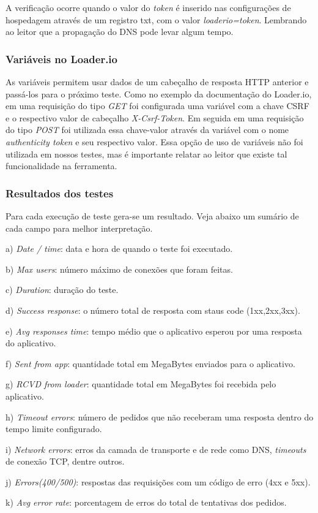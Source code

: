   A verificação ocorre quando o valor do \textit{token} é inserido nas configurações de hospedagem através de um
  registro txt, com o valor \textit{loaderio=token}.
  Lembrando ao leitor que a propagação do \ac{DNS} pode levar algum tempo.

\subsubsection{Variáveis no Loader.io}

  As variáveis permitem usar dados de um cabeçalho de resposta \ac{HTTP} anterior e passá-los para o próximo
  teste.
  Como no exemplo da documentação do Loader.io, em uma requisição do tipo \textit{GET} foi configurada uma variável
  com a chave CSRF e o respectivo valor de cabeçalho \textit{X-Csrf-Token}. Em seguida em uma requisição
  do tipo \textit{POST} foi utilizada essa chave-valor através da variável com o nome \textit{authenticity token} e seu respectivo
  valor.
  Essa opção de uso de variáveis não foi utilizada em nossos testes, mas é importante relatar ao leitor que
  existe tal funcionalidade na ferramenta.


\subsubsection{Resultados dos testes}
  
  \vspace{-0.7cm}
  
  Para cada execução de teste gera-se um resultado. Veja abaixo um sumário de cada campo para melhor interpretação.

  \begin{compactitem}
    \item[a)] \textit{Date / time}: data e hora de quando o teste foi executado.
    \item[b)] \textit{Max users}: número máximo de conexões que foram feitas.
    \item[c)] \textit{Duration}:  duração do teste.
    \item[d)] \textit{Success response}: o número total de resposta com staus code (1xx,2xx,3xx).
    \item[e)] \textit{Avg responses time}: tempo médio que o aplicativo esperou por uma resposta do aplicativo.
    \item[f)] \textit{Sent from app}: quantidade total em MegaBytes enviados para o aplicativo.
    \item[g)] \textit{RCVD from loader}: quantidade total em MegaBytes foi recebida pelo aplicativo.
    \item[h)] \textit{Timeout errors}: número de pedidos que não receberam uma resposta dentro do tempo limite configurado.
    \item[i)] \textit{Network errors}: erros da camada de transporte e de rede como \ac{DNS}, \textit{timeouts} de conexão TCP, dentre outros.
    \item[j)] \textit{Errors(400/500)}: respostas das requisições com um código de erro (4xx e 5xx).
    \item[k)] \textit{Avg error rate}: porcentagem de erros do total de tentativas dos pedidos.
  \end{compactitem}

